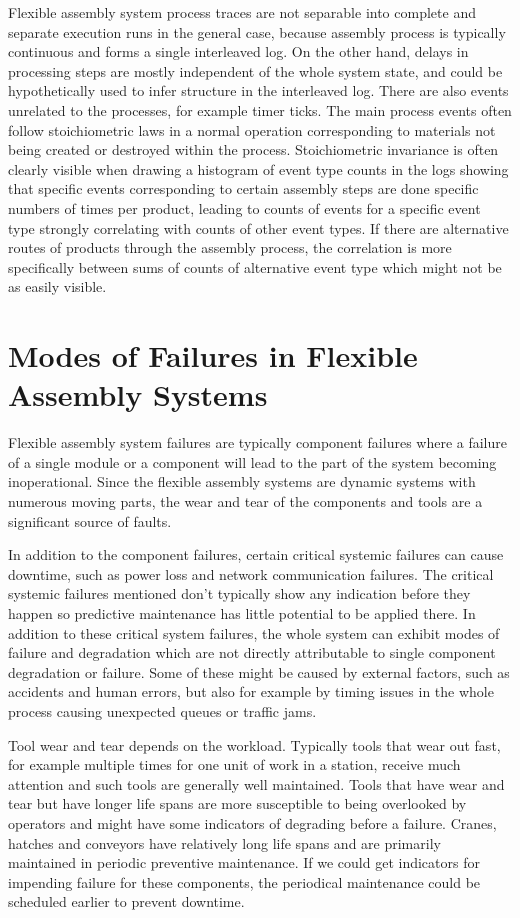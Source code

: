 \documentclass[procedia]{easychair}
\begin{document}
Flexible assembly system process traces are not separable into complete and separate execution runs in the general case, because assembly process is typically continuous and
forms a single interleaved log.
On the other hand, delays in processing steps are mostly independent of the whole system state, and could be hypothetically used to infer structure in the interleaved log.
There are also events unrelated to the processes, for example timer ticks. The main process events often follow stoichiometric laws in a normal operation corresponding to materials
not being created or destroyed within the process. Stoichiometric invariance is often clearly visible when drawing a histogram of event type counts in the logs showing that specific events corresponding to certain
assembly steps are done specific numbers of times per product, leading to counts of events for a specific event type strongly correlating with counts of other event types. If there are alternative routes of products
through the assembly process, the correlation is more specifically between sums of counts of alternative event type which might not be as easily visible.

\section{Modes of Failures in Flexible Assembly Systems}

Flexible assembly system failures are typically component failures where a failure of a single module or a component will lead to the part of the system becoming inoperational.
Since the flexible assembly systems are dynamic systems with numerous moving parts, the wear and tear of the components and tools are a significant source of faults.

In addition to the component failures, certain critical systemic failures can cause downtime, such as power loss and network communication failures.
The critical systemic failures mentioned don't typically show any indication before they happen so predictive maintenance has little potential to be applied there.
In addition to these critical system failures,
the whole system can exhibit modes of failure and degradation which are not directly attributable to single component degradation or failure.
Some of these might be caused by
external factors, such as accidents and human errors, but also for example by timing issues in the whole process causing unexpected queues or traffic jams.

Tool wear and tear depends on the workload. Typically tools that wear out fast, for example multiple times for one unit of work in a station, receive much attention and such tools are generally
well maintained. Tools that have wear and tear but have longer life spans are more susceptible to being overlooked by operators and might have some indicators of degrading
before a failure. Cranes, hatches and conveyors have relatively long life spans and are primarily maintained in periodic preventive maintenance. If we could get indicators
for impending failure for these components, the periodical maintenance could be scheduled earlier to prevent downtime.
\end{document}
